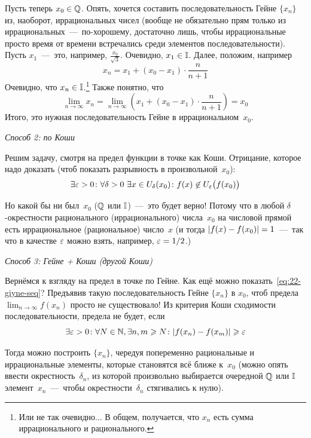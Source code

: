 \documentclass[a4paper,12pt]{article}
\begin{document}
\begin{solution}
    Пусть теперь $x_0 \hm\in \QQ$.
    Опять, хочется составить последовательность Гейне $\{x_n\}$ из, наоборот, иррациональных чисел (вообще не обязательно прям только из иррациональных~---~по-хорошему, достаточно лишь, чтобы иррациональные просто время от времени встречались среди элементов последовательности).
    Пусть $x_1$~---~это, например, $\frac{x_0}{\sqrt{3}}$.
    Очевидно, $x_1 \hm\in \II$.
    Далее, положим, например
    \[
      x_n = x_1 + (x_0 - x_1) \cdot \frac{n}{n + 1}
    \]
    Очевидно, что $x_n \hm\in \II$.\footnote{
      Или не так очевидно...
      В общем, получается, что $x_n$ есть сумма иррационального и рационального.
    }
    Также понятно, что
    \[
      \lim_{n \to \infty} x_n = \lim_{n \to \infty} \left(x_1 + (x_0 - x_1) \cdot \frac{n}{n + 1}\right) = x_0
    \]
    Итого, это нужная последовательность Гейне в иррациональном~$x_0$.

    \medskip
    
    \emph{Способ 2: по Коши}

    Решим задачу, смотря на предел функции в точке как Коши.
    Отрицание, которое надо доказать (чтоб показать разрывность в произвольной~$x_0$):
    \[
      \exists \varepsilon > 0\colon \forall \delta > 0\ \exists x \in U_{\delta}(x_0)\colon f(x) \not\in U_{\varepsilon}\bigl(f(x_0)\bigr)
    \]

    Но какой бы ни был~$x_0$ ($\mathbb Q$ или $\mathbb I$)~---~это будет верно!
    Потому что в любой $\delta$-окрестности рационального (иррационального) числа~$x_0$ на числовой прямой есть иррациональное (рациональное) число~$x$ (и тогда $|f(x) \hm- f(x_0)| \hm= 1$~---~так что в качестве $\varepsilon$ можно взять, например, $\eps \hm= 1 \hm/ 2$.)

    \medskip
    
    \emph{Способ 3: Гейне + Коши (другой Коши)}

    Вернёмся к взгляду на предел в точке по Гейне.
    Как ещё можно показать~\eqref{eq:22-giyne-seq}?
    Предъявив такую последовательность Гейне $\{x_n\}$ в $x_0$, чтоб предела $\lim_{n \to \infty} f(x_n)$ просто не существовало!
    Из критерия Коши сходимости последовательности, предела не будет, если
    \[
      \exists \varepsilon > 0\colon \forall N \in \mathbb N, \exists n, m \geqslant N\colon |f(x_n) - f(x_m)| \geqslant \varepsilon
    \]

    Тогда можно построить $\{x_n\}$, чередуя попеременно рациональные и иррациональные элементы, которые становятся всё ближе к~$x_0$ (можно опять ввести окрестность~$\delta_n$, из которой произвольно выбирается очередной $\mathbb Q$ или $\mathbb I$ элемент~$x_n$~---~чтобы окрестности~$\delta_n$ стягивались к нулю).
    

\end{solution}
\end{document}
